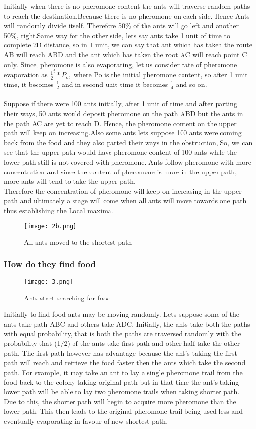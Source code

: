 \documentclass[11pt]{article}
\begin{document}
Initially when there is no pheromone content the ants will traverse random paths to reach the destination.Because there is no pheromone on each side. Hence Ants will randomly divide itself. Therefore 50\% of the ants will go left and another 50\%, right.Same way for the other side, lets say ants take 1 unit of time to complete 2D distance, so in 1 unit, we can say that ant which has taken the route AB will reach ABD and the ant which has taken the root AC will reach point C only. Since, pheromone is also evaporating, let us consider rate of pheromone evaporation as $\frac{1}{2}^t * P_{o},$
where Po is the initial pheromone content, so after 1 unit time, it becomes $\frac{1}{2}$ and in second unit time it becomes $\frac{1}{4}$ and so on.\\ \\
Suppose if there were 100 ants initially, after 1 unit of time and after parting their ways, 50 ants would deposit pheromone on the path ABD but the ants in the path AC are yet to reach D. Hence, the pheromone content on the upper path will keep on increasing.Also some ants lets suppose 100 ants were coming back from the food and  they also parted their ways in the obstruction, So, we can see that the upper path would have pheromone content of 100 ants while the lower path still is not covered with pheromone. Ants follow pheromone with more concentration and since the content of pheromone is more in the upper path, more ants will tend to take the upper path. \\
Therefore the concentration of pheromone will keep on increasing in the upper path and ultimately a stage will come when all ants will move towards one path thus establishing the Local maxima.
\begin{figure}[H]
\centering
\texttt{[image: 2b.png]}
\caption{All ants moved to the shortest path}
\label{fig:2b}
\end{figure}
 \subsubsection{How do they find food}
 
\begin{figure}[H]
\centering
\texttt{[image: 3.png]}
\caption{Ants start searching for food}
\label{fig:3}
\end{figure}
Initially to find food ants may be moving randomly. Lets suppose some of the ants take path ABC and others take ADC. Initially, the ants take both the paths with
equal probability, that is both the paths are traversed randomly with the probability that (1/2) of the ants take first path and other half take the other path.
The first path however has advantage because the ant's taking the first path will reach and retrieve the food faster then the ants which take the second path. For example, it may take an ant to lay a single pheromone trail from the food back to the colony taking original path but in that time the ant's taking lower path will be able to lay two pheromone trails when taking shorter path. Due to this, the shorter path will begin to acquire more pheromone than the lower path. This then leads to the original pheromone trail being used less and eventually evaporating in favour of new shortest path.
\end{document}
